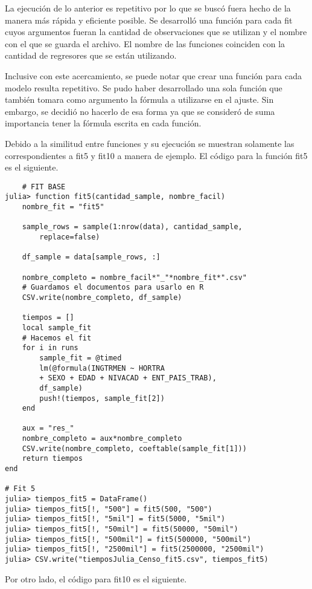 La ejecución de lo anterior es repetitivo por lo que se buscó fuera hecho de la manera más rápida y eficiente posible. Se desarrolló una función para cada \textsf{fit} cuyos argumentos fueran la cantidad de observaciones que se utilizan y el nombre con el que se guarda el archivo. El nombre de las funciones coinciden con la cantidad de regresores que se están utilizando. 

Inclusive con este acercamiento, se puede notar que crear una función para cada modelo resulta repetitivo. Se pudo haber desarrollado una sola función que también tomara como argumento la fórmula a utilizarse en el ajuste. Sin embargo, se decidió no hacerlo de esa forma ya que se consideró de suma importancia tener la fórmula escrita en cada función. 

Debido a la similitud entre funciones y su ejecución se muestran solamente las correspondientes a \textsf{fit5} y \textsf{fit10} a manera de ejemplo. El código para la función \textsf{fit5} es el siguiente.

\begin{verbatim}
	# FIT BASE
julia> function fit5(cantidad_sample, nombre_facil)
	nombre_fit = "fit5"
	
	sample_rows = sample(1:nrow(data), cantidad_sample, 
		replace=false)
	
	df_sample = data[sample_rows, :]
	
	nombre_completo = nombre_facil*"_"*nombre_fit*".csv"
	# Guardamos el documentos para usarlo en R
	CSV.write(nombre_completo, df_sample)
	
	tiempos = []
	local sample_fit
	# Hacemos el fit
	for i in runs
		sample_fit = @timed 
		lm(@formula(INGTRMEN ~ HORTRA 
		+ SEXO + EDAD + NIVACAD + ENT_PAIS_TRAB), 
		df_sample)
		push!(tiempos, sample_fit[2])
	end
	
	aux = "res_"
	nombre_completo = aux*nombre_completo
	CSV.write(nombre_completo, coeftable(sample_fit[1]))
	return tiempos
end 

# Fit 5
julia> tiempos_fit5 = DataFrame()
julia> tiempos_fit5[!, "500"] = fit5(500, "500")
julia> tiempos_fit5[!, "5mil"] = fit5(5000, "5mil")
julia> tiempos_fit5[!, "50mil"] = fit5(50000, "50mil")
julia> tiempos_fit5[!, "500mil"] = fit5(500000, "500mil")
julia> tiempos_fit5[!, "2500mil"] = fit5(2500000, "2500mil")
julia> CSV.write("tiemposJulia_Censo_fit5.csv", tiempos_fit5)

\end{verbatim}

Por otro lado, el código para \textsf{fit10} es el siguiente. 

